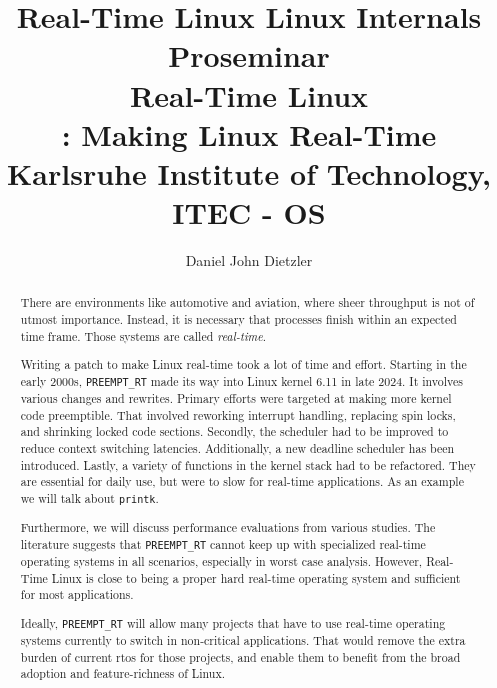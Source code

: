 \documentclass[10pt,twocolumn,a4paper]{article}
\begin{document}


\title{Real-Time Linux}

\title{%
{\normalfont \normalsize Linux Internals Proseminar}\\%
Real-Time Linux \\%
{\normalfont \normalsize {}: Making Linux Real-Time}\\%
{\normalfont \small
Karlsruhe Institute of Technology, ITEC - OS
}%
}

\author{Daniel John Dietzler}

\newcommand{\code}[1]{{\tt \small{#1}}}

\maketitle

\begin{abstract}
  There are environments like automotive and aviation, where sheer throughput is not of utmost importance.
  Instead, it is necessary that processes finish within an expected time frame.
  Those systems are called \emph{real-time}.

  Writing a patch to make Linux real-time took a lot of time and effort.
  Starting in the early 2000s, \code{PREEMPT\_RT} made its way into Linux kernel 6.11 in late 2024.
  It involves various changes and rewrites.
  Primary efforts were targeted at making more kernel code preemptible.
  That involved reworking interrupt handling, replacing spin locks, and shrinking locked code sections.
  Secondly, the scheduler had to be improved to reduce context switching latencies.
  Additionally, a new deadline scheduler has been introduced.
  Lastly, a variety of functions in the kernel stack had to be refactored.
  They are essential for daily use, but were to slow for real-time applications.
  As an example we will talk about \code{printk}.

  Furthermore, we will discuss performance evaluations from various studies.
  The literature suggests that \code{PREEMPT\_RT} cannot keep up with specialized real-time operating systems in all scenarios, especially in worst case analysis.
  However, Real-Time Linux is close to being a proper hard real-time operating system and sufficient for most applications.

  Ideally, \code{PREEMPT\_RT} will allow many projects that have to use real-time operating systems currently to switch in non-critical applications.
  That would remove the extra burden of current \acrfull{rtos} for those projects, and enable them to benefit from the broad adoption and feature-richness of Linux.
\end{abstract}
\end{document}
